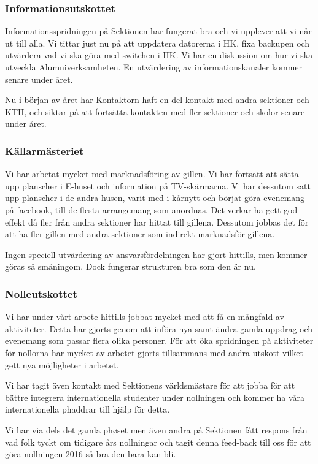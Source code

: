 \documentclass[../_main/handlingar.tex]{subfiles}
\begin{document}

\subsubsection*{Informationsutskottet}
Informationsspridningen på Sektionen har fungerat bra och vi upplever att vi når ut till alla. Vi tittar just nu på att uppdatera datorerna i HK, fixa backupen och utvärdera vad vi ska göra med switchen i HK. Vi har en diskussion om hur vi ska utveckla Alumniverksamheten. En utvärdering av informationskanaler kommer senare under året.

Nu i början av året har Kontaktorn haft en del kontakt med andra sektioner och KTH, och siktar på att fortsätta kontakten med fler sektioner och skolor senare under året.

\subsubsection*{Källarmästeriet}
Vi har arbetat mycket med marknadsföring av gillen. Vi har fortsatt att sätta upp planscher i E-huset och information på TV-skärmarna. Vi har dessutom satt upp planscher i de andra husen, varit med i kårnytt och börjat göra evenemang på facebook, till de flesta arrangemang som anordnas. Det verkar ha gett god effekt då fler från andra sektioner har hittat till gillena. Dessutom jobbas det för att ha fler gillen med andra sektioner som indirekt marknadsför gillena.

Ingen speciell utvärdering av ansvarsfördelningen har gjort hittills, men kommer göras så småningom. Dock fungerar strukturen bra som den är nu.

\subsubsection*{Nolleutskottet}
Vi har under vårt arbete hittills jobbat mycket med att få en mångfald av aktiviteter. Detta har gjorts genom att införa nya samt ändra gamla uppdrag och evenemang som passar flera olika personer. För att öka spridningen på aktiviteter för nollorna har mycket av arbetet gjorts tillsammans med andra utskott vilket gett nya möjligheter i arbetet.

Vi har tagit även kontakt med Sektionens världsmästare för att jobba för att bättre integrera internationella studenter under nollningen och kommer ha våra internationella phaddrar till hjälp för detta.

Vi har via dels det gamla phøset men även andra på Sektionen fått respons från vad folk tyckt om tidigare års nollningar och tagit denna feed-back till oss för att göra nollningen 2016 så bra den bara kan bli.
\end{document}
